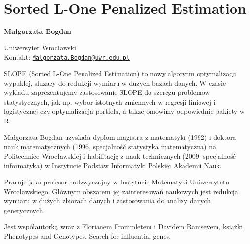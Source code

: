 \documentclass[\main/boa.tex]{subfiles}
\begin{document}
\section{Sorted L-One Penalized Estimation}


\begin{minipage}{0.915\textwidth}
	\centering
  {\bf \huge {} Małgorzata Bogdan}
\end{minipage}


\vskip 0.3cm

\begin{affiliations}
\begin{minipage}{0.915\textwidth}
\centering
\large Uniwersytet Wrocławski  \\[5pt]
Kontakt: \href{mailto:Malgorzata.Bogdan@uwr.edu.pl}{\nolinkurl{Malgorzata.Bogdan@uwr.edu.pl}}\\
\end{minipage}
\end{affiliations}

\vskip 0.8cm

SLOPE (Sorted L-One Penalized Estimation) to nowy algorytm optymalizacji wypuklej, sluzacy do redukcji wymiaru w duzych bazach danych. W czasie wykladu zaprezentujemy zastosowanie SLOPE do szeregu problemow statystycznych, jak np. wybor istotnych zmiennych w regresji liniowej i logistycznej czy optymalizacja portfela, a takze omowimy odpowiednie pakiety w R. 

\bio
Małgorzata Bogdan uzyskała dyplom magistra z matematyki (1992) i doktora nauk matematycznych (1996, specjalność statystyka matematyczna) na Politechnice Wrocławskiej i habilitację z nauk technicznych (2009, specjalność informatyka) w Instytucie Podstaw Informatyki Polskiej Akademii Nauk.

Pracuje jako profesor nadzwyczajny w Instytucie Matematyki Uniwersytetu Wrocławskiego. Głównym obszarem jej zainteresowań naukowych jest redukcja wymiaru w dużych zbiorach danych i zastosowania do analizy danych genetycznych.

Jest współautorką wraz z Florianem Frommletem i Davidem Ramseyem, książki Phenotypes and Genotypes. Search for influential genes.
\end{document}
